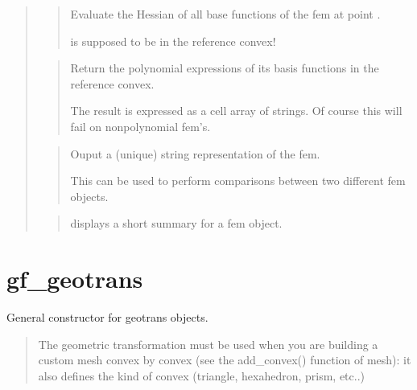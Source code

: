 \documentclass[a4paper,11pt,english]{sphinxmanual}
\begin{document}
\begin{quote}
\begin{quote}
Evaluate the Hessian of all base functions of the fem at point .

 is supposed to be in the reference convex!
\end{quote}

\begin{quote}

Return the polynomial expressions of its basis functions in
the reference convex.

The result is expressed as a cell array of
strings. Of course this will fail on non\sphinxhyphen{}polynomial fem’s.
\end{quote}

\begin{quote}

Ouput a (unique) string representation of the fem.

This can be used to perform comparisons between two different fem
objects.
\end{quote}

\begin{quote}

displays a short summary for a fem object.
\end{quote}
\end{quote}


\section{gf\_geotrans}
\label{\detokenize{matlab_octave/cmdref_gf_geotrans:gf-geotrans}}\label{\detokenize{matlab_octave/cmdref_gf_geotrans::doc}}

\begin{sphinxVerbatim}[commandchars=\\\{\}]
   
\end{sphinxVerbatim}


General constructor for geotrans objects.
\begin{quote}

The geometric transformation must be used when you are building a custom
mesh convex by convex (see the add\_convex() function of mesh): it also
defines the kind of convex (triangle, hexahedron, prism, etc..)
\end{quote}
\end{document}
